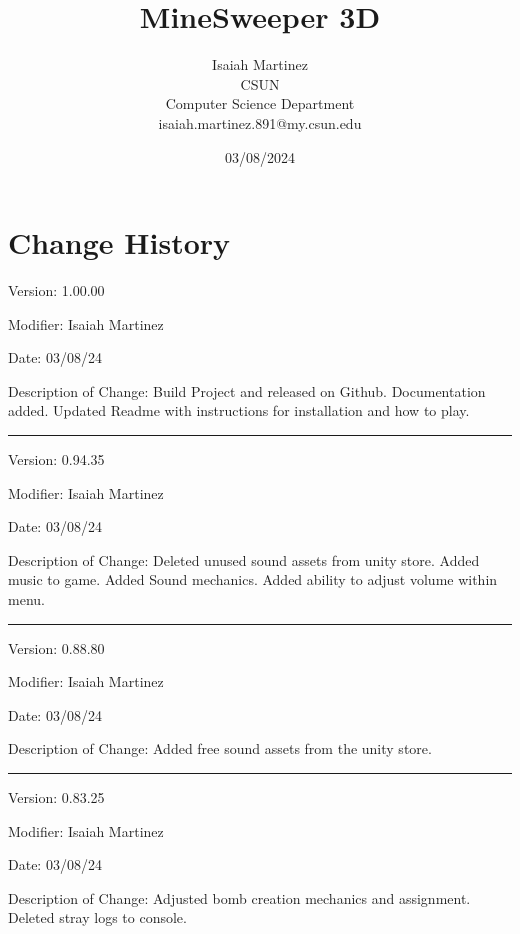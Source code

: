 \documentclass[a4paper,10pt]{article}
\begin{document}
    \title{MineSweeper 3D}

    \author{Isaiah Martinez \\ CSUN \\ Computer Science Department \\ isaiah.martinez.891@my.csun.edu}
          
    \date{03/08/2024}

    \maketitle
   
    \tableofcontents

    \newpage

    \section{Change History}

    Version: 1.00.00

    Modifier: Isaiah Martinez
    
    Date: 03/08/24
    
    Description of Change: Build Project and released on Github.
    Documentation added.
    Updated Readme with instructions for installation and how to play.
 
    \noindent\rule{12cm}{0.4pt}

    Version: 0.94.35

    Modifier: Isaiah Martinez
    
    Date: 03/08/24
    
    Description of Change: Deleted unused sound assets from unity store.
    Added music to game.
    Added Sound mechanics.
    Added ability to adjust volume within menu.
 
    \noindent\rule{12cm}{0.4pt}

    Version: 0.88.80

    Modifier: Isaiah Martinez
    
    Date: 03/08/24
    
    Description of Change: Added free sound assets from the unity store.
 
    \noindent\rule{12cm}{0.4pt}

    Version: 0.83.25

    Modifier: Isaiah Martinez
    
    Date: 03/08/24
    
    Description of Change: Adjusted bomb creation mechanics and assignment.
    Deleted stray logs to console.
 
\end{document}
